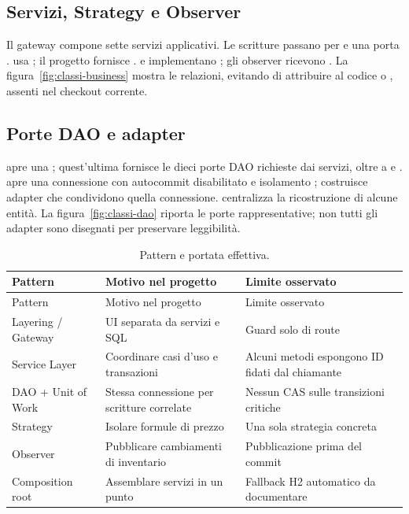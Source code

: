 \subsection{Servizi, Strategy e Observer}
Il gateway compone sette servizi applicativi. Le scritture passano per  e una porta .  usa ; il progetto fornisce .  e  implementano ; gli observer ricevono . La figura~\ref{fig:classi-business} mostra le relazioni, evitando di attribuire al codice  o , assenti nel checkout corrente.

\subsection{Porte DAO e adapter}
 apre una ; quest'ultima fornisce le dieci porte DAO richieste dai servizi, oltre a  e .  apre una connessione con autocommit disabilitato e isolamento ;  costruisce adapter che condividono quella connessione.  centralizza la ricostruzione di alcune entità. La figura~\ref{fig:classi-dao} riporta le porte rappresentative; non tutti gli adapter sono disegnati per preservare leggibilità.

\begin{longtable}{p{.23\linewidth}p{.38\linewidth}p{.29\linewidth}}
\caption{Pattern e portata effettiva.}\label{tab:pattern}\\
\toprule Pattern & Motivo nel progetto & Limite osservato\\\midrule\endfirsthead
\toprule Pattern & Motivo nel progetto & Limite osservato\\\midrule\endhead
Layering / Gateway & UI separata da servizi e SQL & Guard solo di route\\
Service Layer & Coordinare casi d'uso e transazioni & Alcuni metodi espongono ID fidati dal chiamante\\
DAO + Unit of Work & Stessa connessione per scritture correlate & Nessun CAS sulle transizioni critiche\\
Strategy & Isolare formule di prezzo & Una sola strategia concreta\\
Observer & Pubblicare cambiamenti di inventario & Pubblicazione prima del commit\\
Composition root & Assemblare servizi in un punto & Fallback H2 automatico da documentare\\
\bottomrule
\end{longtable}
